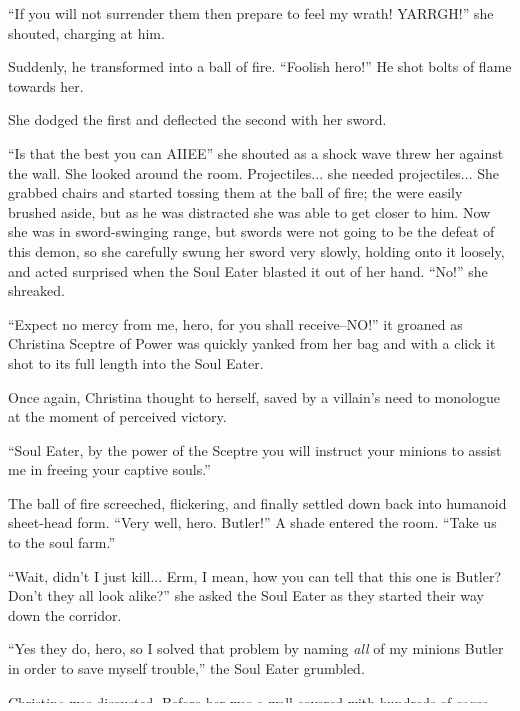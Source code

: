 \documentclass[showtrims,b6paper,draft,10pt]{memoir}
\begin{document}
``If you will not surrender them then prepare to feel my wrath!  YARRGH!'' she shouted, charging at him.

Suddenly, he transformed into a ball of fire.  ``Foolish hero!''  He shot bolts of flame towards her.

She dodged the first and deflected the second with her sword.

``Is that the best you can AIIEE'' she shouted as a shock wave threw her against the wall.  She looked around the room.  Projectiles... she needed projectiles...  She grabbed chairs and started tossing them at the ball of fire;  the were easily brushed aside, but as he was distracted she was able to get closer to him.  Now she was in sword-swinging range, but swords were not going to be the defeat of this demon, so she carefully swung her sword very slowly, holding onto it loosely, and acted surprised when the  Soul Eater blasted it out of her hand.  ``No!'' she shreaked.

``Expect no mercy from me, hero, for you shall receive--NO!'' it groaned as Christina Sceptre of Power was quickly yanked from her bag and with a click it shot to its full length into the Soul Eater.

Once again, Christina thought to herself, saved by a villain's need to monologue at the moment of perceived victory.

``Soul Eater, by the power of the Sceptre you will instruct your minions to assist me in freeing your captive souls.''

The ball of fire screeched, flickering, and finally settled down back into humanoid sheet-head form.  ``Very well, hero.  Butler!''  A shade entered the room.  ``Take us to the soul farm.''

``Wait, didn't I just kill...  Erm, I mean, how you can tell that this one is Butler?  Don't they all look alike?'' she asked the Soul Eater as they started their way down the corridor.

``Yes they do, hero, so I solved that problem by naming \emph{all} of my minions Butler in order to save myself trouble,'' the Soul Eater grumbled.

\timeskip
Christina was disgusted.  Before her was a wall covered with hundreds of cages, with a naked human being in each one.  Excrement was piled in a pool underneath all of the cages.  The indecency of the whole thing horrified her!

What also amazed her, though, was how still they all were;  there was a blanket covering each head.
\end{document}

